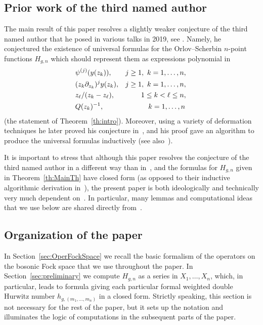 \subsection{Prior work of the third named author} The main result of this paper resolves a slightly weaker conjecture of the third named author that he posed in various talks in 2019, see \eg \cite{Kaz2019}. Namely, he conjectured the existence of universal formulas for the Orlov--Scherbin $n$-point functions $H_{g,n}$ which should represent them as expressions polynomial in
\begin{align*}
\hspace*{3cm}& \psi^{(j)}(y(z_k)), & j\geq 1,\ k=1,\dots, n,\hspace*{3cm}\mbox{} \\
& (z_k\partial_{z_k})^j y(z_k), & j\geq 1,\ k=1,\dots, n,\hspace*{3cm}\mbox{} \\
& z_\ell/(z_k-z_\ell), & 1\leq k < \ell \leq n,\hspace*{3cm}\mbox{} \\
& Q(z_k)^{-1}, & k=1,\dots,n\hphantom{,}\hspace*{3cm}\mbox{}
\end{align*}
(\cf the statement of Theorem~\ref{th:intro}).
Moreover, using a variety of deformation techniques he later proved his conjecture in~\cite{Kaz2020}, and his proof gave an algorithm to produce the universal formulas inductively (see also~\cite{Kaz2020a}).

It is important to stress that although this paper resolves the conjecture of the third named author in a different way than in~\cite{Kaz2020}, and the formulas for $H_{g,n}$ given in Theorem~\ref{th:MainTh} have closed form (as opposed to their inductive algorithmic derivation in~\cite{Kaz2020}), the present paper is both ideologically and technically very much dependent on~\cite{Kaz2020}. In particular, many lemmas and computational ideas that we use below are shared directly from~\cite{Kaz2020}.

\subsection{Organization of the paper} In Section~\ref{sec:OperFockSpace} we recall the basic formalism of the operators on the bosonic Fock space that we use throughout the paper. In Section~\ref{sec:preliminary} we compute $H_{g,n}$ as a series in $X_1,\dots,X_n$, which, in particular, leads to formula giving
each particular formal weighted double Hurwitz number $h_{g,(m_1,\dots,m_n)}$ in a closed form. Strictly speaking, this section is not necessary for the rest of the paper, but it sets up the notation and illuminates the logic of computations in the subsequent parts of the paper.

